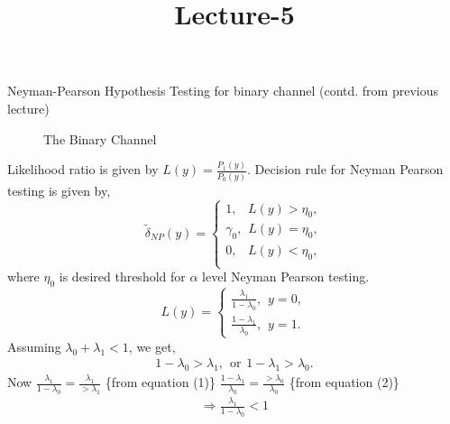 \documentclass[a4paper,english,12pt]{article}
\title{Lecture-5 }
\begin{document}
\maketitle
\begin{exmp}{Neyman-Pearson Hypothesis Testing for binary channel (contd. from previous lecture)}
\begin{figure}
\centering

\caption{The Binary Channel}
\end{figure}
Likelihood ratio is given by  $ L(y) = \frac{{P}_1(y)}{{P}_0(y)} $. Decision rule for Neyman Pearson testing is given by,
\begin{equation}
\tilde{\delta}_{NP} (y)=
\begin{cases}
1,\hspace{10pt}L(y) > \eta_0,\\ 
\gamma_0,\hspace{5pt}L(y)= \eta_0,\\
0,\hspace{10pt}L(y) < \eta_0,\\
\end{cases}
\end{equation}
where $\eta_0$ is desired threshold for $\alpha$ level Neyman Pearson testing.
\begin{equation}
L(y) = \begin{cases}
\frac{\lambda_1}{1-\lambda_0},\hspace{5pt}y=0,  \\ 
\frac{1-\lambda_1}{\lambda_0},\hspace{5pt}y=1.
\end{cases}
\end{equation}
Assuming $\lambda_0 + \lambda_1 < 1$, we get,
\begin{eqnarray}
1-\lambda_0 > \lambda_1,\hspace{5pt}\mbox{or}\hspace{5pt}1-\lambda_1 > \lambda_0.
\end{eqnarray}
Now $\frac{\lambda_1}{1-\lambda_0} = \frac{\lambda_1}{>\lambda_1}$
\{from equation (1)\} 
$\frac{1-\lambda_1}{\lambda_0} = \frac{>\lambda_0}{\lambda_0}$
\{from equation (2)\} 
\begin{eqnarray}
&\Rightarrow \frac{\lambda_1}{1-\lambda_0} < 1& \\

\end{eqnarray}
\end{exmp}
\end{document}
